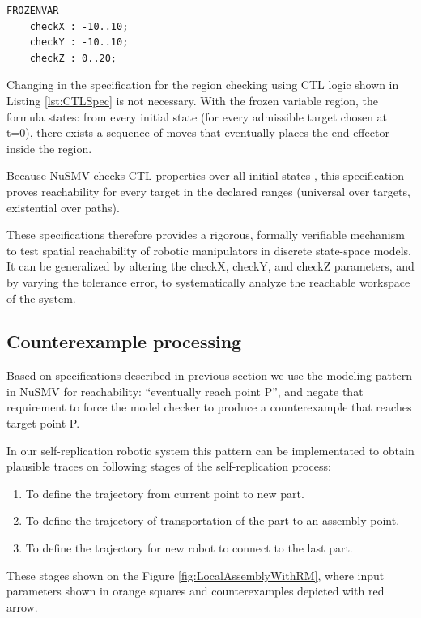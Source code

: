 \begin{lstlisting}[language=NuSMV, caption={Region definition for a reachability checking}, 
    label={lst:RegionDefinition}]
FROZENVAR
    checkX : -10..10;
    checkY : -10..10;
    checkZ : 0..20;
\end{lstlisting}

Changing in the specification for the region checking using CTL logic 
shown in Listing \ref{lst:CTLSpec} is not necessary.
With the frozen variable region, the formula states: from every initial state 
(for every admissible target chosen at t=0), there exists a sequence 
of moves that eventually places the end-effector inside the region.

Because NuSMV checks CTL properties over all initial states
, this specification proves reachability for every target in the declared 
ranges (universal over targets, existential over paths). 

These specifications therefore provides a rigorous, formally verifiable 
mechanism to test spatial reachability of robotic manipulators in 
discrete state-space models. It can be 
generalized by altering the checkX, checkY, and 
checkZ parameters, and by varying the tolerance error,
to systematically analyze the reachable workspace of the system.

\subsection{Counterexample processing}
\label{ch:Counterexample}

Based on specifications described in previous section we use 
the modeling pattern in NuSMV for reachability: “eventually reach point P”, 
and negate that requirement to force the model checker to produce a counterexample 
that reaches target point P. 

In our self-replication robotic system this pattern can be implementated to obtain 
plausible traces on following stages of the self-replication process:
\begin{enumerate}
    \item To define the trajectory from current point to new part.
    \item To define the trajectory of transportation of the part to an assembly point.
    \item To define the trajectory for new robot to connect to the last part.
\end{enumerate}

These stages shown on the Figure \ref{fig:LocalAssemblyWithRM}, where input parameters 
shown in orange squares and counterexamples depicted with red arrow.

